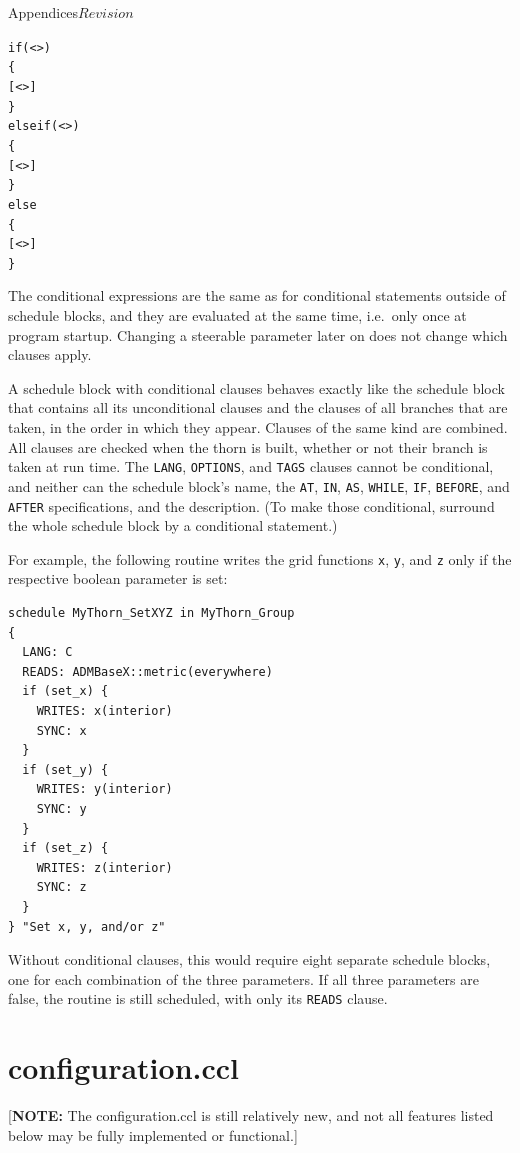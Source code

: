 \begin{cactuspart}{Appendices}{}{$Revision$}
\begin{alltt}
if (<>)
\{
  [<>]
\}
else if (<>)
\{
  [<>]
\}
else
\{
  [<>]
\}
\end{alltt}

The conditional expressions are the same as for conditional statements
outside of schedule blocks, and they are evaluated at the same time, i.e.\
only once at program startup. Changing a steerable parameter later on
does not change which clauses apply.

A schedule block with conditional clauses behaves exactly like the
schedule block that contains all its unconditional clauses and the
clauses of all branches that are taken, in the order in which they
appear. Clauses of the same kind are combined. All clauses are checked
when the thorn is built, whether or not their branch is taken at run
time. The {\tt LANG}, {\tt OPTIONS}, and {\tt TAGS} clauses cannot be
conditional, and neither can the schedule block's name, the
{\tt AT}, {\tt IN}, {\tt AS}, {\tt WHILE}, {\tt IF}, {\tt BEFORE}, and
{\tt AFTER} specifications, and the description. (To make those
conditional, surround the whole schedule block by a conditional
statement.)

For example, the following routine writes the grid functions {\tt x},
{\tt y}, and {\tt z} only if the respective boolean parameter is set:

\begin{verbatim}
schedule MyThorn_SetXYZ in MyThorn_Group
{
  LANG: C
  READS: ADMBaseX::metric(everywhere)
  if (set_x) {
    WRITES: x(interior)
    SYNC: x
  }
  if (set_y) {
    WRITES: y(interior)
    SYNC: y
  }
  if (set_z) {
    WRITES: z(interior)
    SYNC: z
  }
} "Set x, y, and/or z"
\end{verbatim}

Without conditional clauses, this would require eight separate
schedule blocks, one for each combination of the three parameters. If
all three parameters are false, the routine is still scheduled, with
only its {\tt READS} clause.


\section{configuration.ccl}
\label{sec:Appendix.configuration.ccl}

[{\bf NOTE:} The configuration.ccl is still relatively new, and not
all features listed below may be fully implemented or functional.]


\end{cactuspart}

